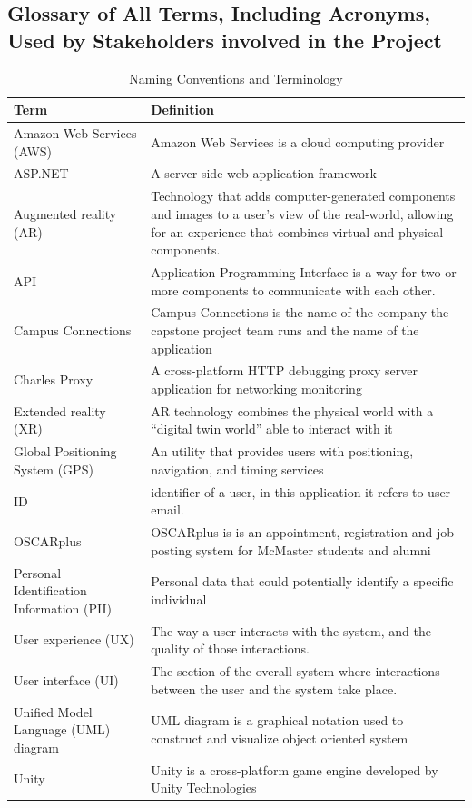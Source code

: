 \documentclass[12pt]{article}
\begin{document}
\subsection{Glossary of All Terms, Including Acronyms, Used by Stakeholders
involved in the Project}
\begin{table}[H]
    \centering
    \begin{tabular}{|p{0.3\linewidth} | p{0.7\linewidth}| }
    \hline
    \textbf{Term} & \textbf{Definition}\\
    \hline
    Amazon Web Services (AWS) & Amazon Web Services is a cloud computing provider\\
    \hline
    ASP.NET & A server-side web application framework\\
    \hline
    Augmented reality (AR) & Technology that adds computer-generated components and images to a user’s view of the real-world, allowing for an experience that combines virtual and physical components.\\
    \hline
    API & Application Programming Interface is a way for two or more components to communicate with each other.\\
    \hline
    Campus Connections & Campus Connections is the name of the company the capstone project team runs and the name of the application\\
    \hline
    Charles Proxy & A cross-platform HTTP debugging proxy server application for networking monitoring\\
    \hline
    Extended reality (XR) & AR technology combines the physical world with a ``digital twin world'' able to interact with it\\
    \hline
    Global Positioning System (GPS) & An utility that provides users with positioning, navigation, and timing services\\
    \hline
    ID & identifier of a user, in this application it refers to user email.\\
    \hline
    OSCARplus & OSCARplus is is an appointment, registration and job posting system for McMaster students and alumni\\
    \hline
    Personal Identification Information (PII) & Personal data that could potentially identify a specific individual\\
    \hline
    User experience (UX) & The way a user interacts with the system, and the quality of those interactions.\\
    \hline 
    User interface (UI) & The section of the overall system where interactions between the user and the system take place.\\
    \hline
    Unified Model Language (UML) diagram & UML diagram is a graphical notation used to construct and visualize object oriented system\\
    \hline
    Unity & Unity is a cross-platform game engine developed by Unity Technologies\\
    \hline
    \end{tabular}
    \caption{Naming Conventions and Terminology}
    \label{TblNaming}
\end{table}
\end{document}
